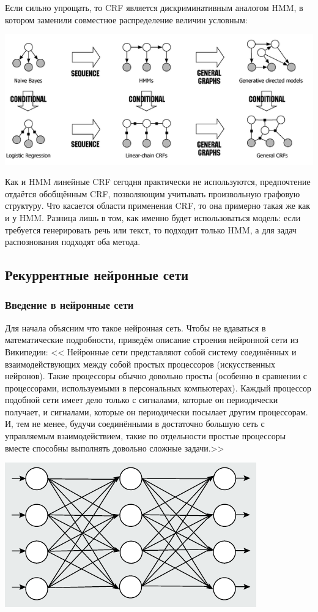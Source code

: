 \documentclass[a4paper,14pt]{extarticle}
\begin{document}
Если сильно упрощать, то CRF является дискриминативным аналогом HMM, в котором заменили совместное распределение величин условным:

\includegraphics[width=1.0\linewidth]{hmm_crf.png}

Как и HMM линейные CRF сегодня практически не используются, предпочтение отдаётся обобщённым CRF, позволяющим учитывать произвольную графовую структуру. Что касается области применения CRF, то она примерно такая же как и у HMM. Разница лишь в том, как именно будет использоваться модель: если требуется генерировать речь или текст, то подходит только HMM, а для задач распознования подходят оба метода.
\subsection{Рекуррентные нейронные сети}
\subsubsection{Введение в нейронные сети}
Для начала объясним что такое нейронная сеть. Чтобы не вдаваться в математические подробности, приведём описание строения нейронной сети из Википедии: << Нейронные сети представляют собой систему соединённых и взаимодействующих между собой простых процессоров (искусственных нейронов). Такие процессоры обычно довольно просты (особенно в сравнении с процессорами, используемыми в персональных компьютерах). Каждый процессор подобной сети имеет дело только с сигналами, которые он периодически получает, и сигналами, которые он периодически посылает другим процессорам. И, тем не менее, будучи соединёнными в достаточно большую сеть с управляемым взаимодействием, такие по отдельности простые процессоры вместе способны выполнять довольно сложные задачи.>>

\medskip

\includegraphics[width=1.0\linewidth]{neuronet.png}
\end{document}

